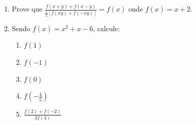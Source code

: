 \documentclass[oneside,a4paper,12pt]{article}
\begin{document}
\begin{enumerate}
	\item Prove que $\frac{f(x+y) + f(x-y)}{\frac{1}{2}[f(xy) + f(-xy)]}=f(x)$ onde $f(x) = x+2$.

	\item Sendo $f(x) = x^{2} + x -6$, calcule:
	\begin{multicols}{5}
	\begin{enumerate}
		\item $f(1)$
		\item $f(-1)$
		\item $f(0)$
		\item $f(-\frac{4}{5})$
		\item $\frac{f(2)+f(-2)}{3f(4)}$
	\end{enumerate}
	\end{multicols}

\end{enumerate}


	
\end{document}
